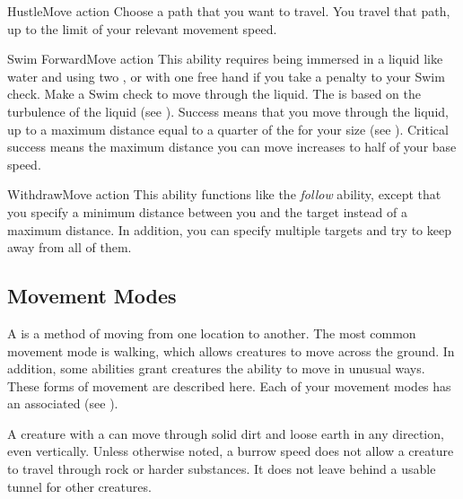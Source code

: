     \begin{activeability}{Hustle}{Move action}
      \rankline
      Choose a path that you want to travel.
      You travel that path, up to the limit of your relevant movement speed.
    \end{activeability}

    \begin{activeability}{Swim Forward}{Move action}
      \rankline
      This ability requires being immersed in a liquid like water and using two , or with one free hand if you take a  penalty to your Swim check.
      Make a Swim check to move through the liquid.
      The  is based on the turbulence of the liquid (see ).
      Success means that you move through the liquid, up to a maximum distance equal to a quarter of the  for your size (see ).
      Critical success means the maximum distance you can move increases to half of your base speed.
    \end{activeability}

    \begin{activeability}{Withdraw}{Move action}
      \rankline
      This ability functions like the \textit{follow} ability, except that you specify a minimum distance between you and the target instead of a maximum distance.
      In addition, you can specify multiple targets and try to keep away from all of them.
    \end{activeability}

  \subsection{Movement Modes}\label{Movement Modes}
    A  is a method of moving from one location to another.
    The most common movement mode is walking, which allows creatures to move across the ground.
    In addition, some abilities grant creatures the ability to move in unusual ways.
    These forms of movement are described here.
    Each of your movement modes has an associated  (see ).

    A creature with a  can move through solid dirt and loose earth in any direction, even vertically.
    Unless otherwise noted, a burrow speed does not allow a creature to travel through rock or harder substances.
    It does not leave behind a usable tunnel for other creatures.

